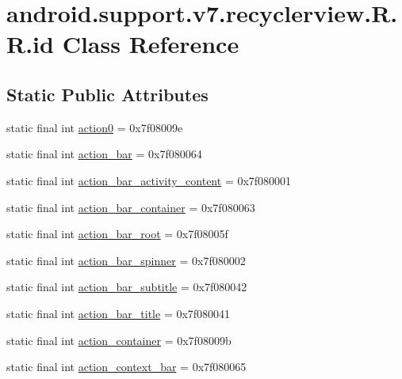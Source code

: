 \hypertarget{classandroid_1_1support_1_1v7_1_1recyclerview_1_1_r_1_1id}{
\section{android.support.v7.recyclerview.R.R.id Class Reference}
\label{classandroid_1_1support_1_1v7_1_1recyclerview_1_1_r_1_1id}
}
\subsection*{Static Public Attributes}
\begin{CompactItemize}
\item 
static final int \hyperlink{classandroid_1_1support_1_1v7_1_1recyclerview_1_1_r_1_1id_70c8a896eb75fe5dd8043f9e8521007d}{action0} = 0x7f08009e
\item 
static final int \hyperlink{classandroid_1_1support_1_1v7_1_1recyclerview_1_1_r_1_1id_3b2d2c77cc00399460c7c796fd35845f}{action\_\-bar} = 0x7f080064
\item 
static final int \hyperlink{classandroid_1_1support_1_1v7_1_1recyclerview_1_1_r_1_1id_5d9c3f6b11e0fa1d9649e7a5702dc446}{action\_\-bar\_\-activity\_\-content} = 0x7f080001
\item 
static final int \hyperlink{classandroid_1_1support_1_1v7_1_1recyclerview_1_1_r_1_1id_8354e6075b749e44648b7b9aa4ddc6e4}{action\_\-bar\_\-container} = 0x7f080063
\item 
static final int \hyperlink{classandroid_1_1support_1_1v7_1_1recyclerview_1_1_r_1_1id_066184a9579c5fceab9150d1a7347c71}{action\_\-bar\_\-root} = 0x7f08005f
\item 
static final int \hyperlink{classandroid_1_1support_1_1v7_1_1recyclerview_1_1_r_1_1id_90816323f0b62af1443bde858ad1c9a1}{action\_\-bar\_\-spinner} = 0x7f080002
\item 
static final int \hyperlink{classandroid_1_1support_1_1v7_1_1recyclerview_1_1_r_1_1id_95bc403ddab12c4bb66d37ba7033be9a}{action\_\-bar\_\-subtitle} = 0x7f080042
\item 
static final int \hyperlink{classandroid_1_1support_1_1v7_1_1recyclerview_1_1_r_1_1id_8ff4917a5d09443f9543cc542fce044d}{action\_\-bar\_\-title} = 0x7f080041
\item 
static final int \hyperlink{classandroid_1_1support_1_1v7_1_1recyclerview_1_1_r_1_1id_2504eaf26f8112d59fd7573503cafd4e}{action\_\-container} = 0x7f08009b
\item 
static final int \hyperlink{classandroid_1_1support_1_1v7_1_1recyclerview_1_1_r_1_1id_d7010608f40ce16d73eb9af9895c7d41}{action\_\-context\_\-bar} = 0x7f080065

\end{CompactItemize}
